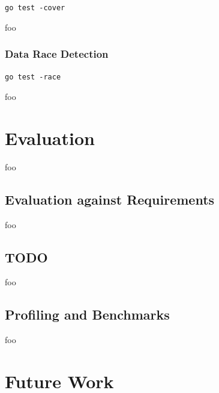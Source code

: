 \documentclass[12pt, a4paper]{article}
\begin{document}
\texttt{go test -cover}

foo

\subsubsection{Data Race Detection}

\texttt{go test -race}

foo

\pagebreak



\section{Evaluation}

foo


\subsection{Evaluation against Requirements}

foo


\subsection{TODO}

foo


\subsection{Profiling and Benchmarks}

foo

\pagebreak


\section{Future Work}
\end{document}

